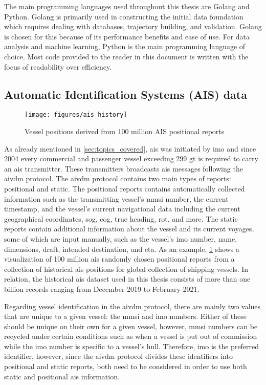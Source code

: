 The main programming languages used throughout this thesis are Golang and Python. Golang is primarily used in constructing the initial data foundation which requires dealing with databases, trajectory building, and validation. Golang is chosen for this because of its performance benefits and ease of use. For data analysis and machine learning, Python is the main programming language of choice. Most code provided to the reader in this document is written with the focus of readability over efficiency.

\subsection{Automatic Identification Systems (AIS) data}
\label{sec:ais_data}

\begin{figure}[htbp]  %
    \centering
    \texttt{[image: figures/ais\_history]}
    \caption{Vessel positions derived from 100 million AIS positional reports}
    \label{fig:ais_positions}
\end{figure}

As already mentioned in \cref{sec:topics_covered}, \acrfull{ais} was initiated by \acrfull{imo} and since 2004 every commercial and passenger vessel exceeding 299 \acrfull{gt} is required to carry an \acrshort{ais} transmitter. These transmitters broadcasts \acrshort{ais} messages following the \gls{aivdm} protocol. The \gls{aivdm} protocol contains two main types of reports: positional and static. The positional reports contains automatically collected information such as the transmitting vessel's \acrfull{mmsi} number, the current timestamp, and the vessel's current navigational data including the current geographical coordinates, \acrfull{sog}, \acrfull{cog}, true heading, \acrfull{rot}, and more. The static reports contain additional information about the vessel and its current voyages, some of which are input manually, such as the vessel's \acrshort{imo} number, name, dimensions, draft, intended destination, and \acrfull{eta}. As an example, \cref{fig:ais_positions} shows a visualization of 100 million \acrshort{ais} randomly chosen positional reports from a collection of historical \acrshort{ais} positions for global collection of shipping vessels. In relation, the historical \acrshort{ais} dataset used in this thesis consists of more than one billion records ranging from December 2019 to February 2021.

Regarding vessel identification in the \gls{aivdm} protocol, there are mainly two values that are unique to a given vessel: the \acrshort{mmsi} and \acrshort{imo} numbers. Either of these should be unique on their own for a given vessel, however, \acrshort{mmsi} numbers can be recycled under certain conditions such as when a vessel is put out of commission while the \acrshort{imo} number is specific to a vessel's hull. Therefore, \acrshort{imo} is the preferred identifier, however, since the \gls{aivdm} protocol divides these identifiers into positional and static reports, both need to be considered in order to use both static and positional \acrshort{ais} information.


